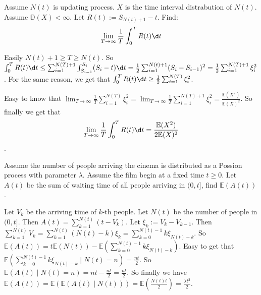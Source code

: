\documentclass{ctexart}
\newif\ifpreface
\begin{document}
\large
\iffalse
  \setlength{\baselineskip}{1.2em}
  \ifpreface
    
  \else
    \maketitle
  \fi
\fi
{}
\begin{problem}\label{pro:1}
  Assume \(N(t)\) is updating process. \(X\) is the time interval distrabution of \(N(t)\).
  Assume \(\mathbb{D}(X)<\infty\).
  Let \(R(t):=S_{N(t)+1}-t\). Find:
  \[
    \lim_{T \to \infty} \frac{1}{T}\int_{0}^{T}R(t) \d t
  \]
\end{problem}
\begin{solution}
  Easily \(N(t)+1 \geq T \geq N(t)\).
  So \(\int_{0}^{T}R(t) \d t \leq \sum_{i=1}^{N(T)+1} \int_{S_{i-1}}^{S_i}(S_i-t) \d t=\frac{1}{2}\sum_{i=1}^{N(t)+1} (S_i-S_{i-1})^2=\frac{1}{2} \sum_{i=1}^{N(T)+1} \xi_i^2\).
  For the same reason, we get that \(\int_{0}^{T}R(t) \d t \geq \frac{1}{2} \sum_{i=1}^{N(T)} \xi_i^2\).

  Easy to know that \(\lim_{T \to \infty} \frac{1}{T} \sum_{i=1}^{N(T)} \xi_i^2=\lim_{T \to \infty} \frac{1}{T} \sum_{i=1}^{N(T)+1} \xi_i^2=\frac{\mathbb{E}(X^2)}{\mathbb{E}(X)^2}\).
  So finally we get that
  \[
    \lim_{T \to \infty} \frac{1}{T}\int_{0}^{T}R(t) \d t=\frac{\mathbb{E}(X^2)}{2\mathbb{E}(X)^2}
  \]
  .
\end{solution}
\begin{problem}\label{pro:2}
  Assume the number of people arriving the cinema is distributed as a Possion process with parameter \(\lambda\).
  Assume the film begin at a fixed time \(t \geq 0\).
  Let \(A(t)\) be the sum of waiting time of all people arriving in \((0,t]\), find \(\mathbb{E}(A(t))\).
\end{problem}
\begin{solution}
  Let \(V_k\) be the arriving time of \(k\)-th people. Let \(N(t)\) be the number of people in \((0,t]\).
  Then \(A(t)=\sum_{k=1}^{N(t)} (t-V_k)\). Let \(\xi_k:=V_k-V_{k-1}\).
  Then \(\sum_{k=1}^{N(t)} V_k=\sum_{k=1}^{N(t)} (N(t)-k)\xi_k=\sum_{k=0}^{N(t)-1} k \xi_{N(t)-k}\).
  So \(\mathbb{E}(A(t))=t \mathbb{E}(N(t))-\mathbb{E}(\sum_{k=0}^{N(t)-1} k\xi_{N(t)-k})\).
  Easy to get that \(\mathbb{E}(\sum_{k=0}^{N(t)-1} k\xi_{N(t)-k} \mid N(t)=n)=\frac{nt}{2}\).
  So \(\mathbb{E}(A(t) \mid N(t)=n)=nt-\frac{nt}{2}=\frac{nt}{2}\).
  So finally we have \(\mathbb{E}(A(t))=\mathbb{E}(\mathbb{E}(A(t) \mid N(t)))=\mathbb{E}(\frac{N(t)t}{2})=\frac{\lambda t^2}{2}\).
\end{solution}
\end{document}
